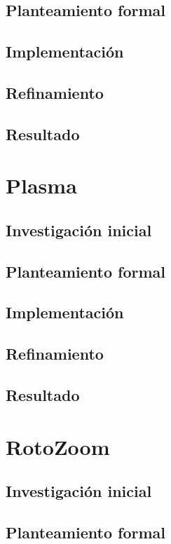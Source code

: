 \subsection{Planteamiento formal}
\subsection{Implementación}
\subsection{Refinamiento}
\subsection{Resultado}

\section{Plasma}

\subsection{Investigación inicial}
\subsection{Planteamiento formal}
\subsection{Implementación}
\subsection{Refinamiento}
\subsection{Resultado}

\section{RotoZoom}

\subsection{Investigación inicial}
\subsection{Planteamiento formal}
